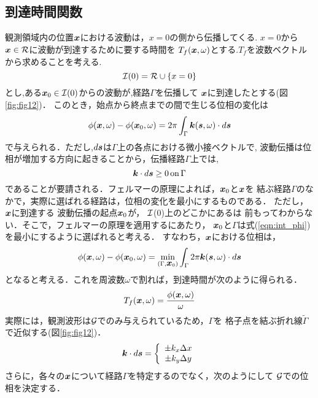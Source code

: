\subsection{到達時間関数}
観測領域内の位置$\mbox{\boldmath{$x$}}$における波動は，$x=0$の側から伝播してくる.
$x=0$から$\fat{x}\in {\cal R}$に波動が到達するために要する時間を
$T_f(\mbox{\boldmath{$x$}},\omega)$とする.$T_f$を波数ベクトルから求めることを考える.
\begin{equation}
	{\cal I}(0)={\cal R} \cup \left\{ x=0\right\}
	\label{eqn:def_I0}
\end{equation}
とし,ある$\fat{x}_0\in {\cal I}(0)$からの波動が,経路$\Gamma$を伝播して
$\mbox{\boldmath{$x$}}$に到達したとする(図\ref{fig:fig12})．
このとき，始点から終点までの間で生じる位相の変化は
\begin{equation}
	\phi(\fat{x},\omega)-\phi(\fat{x}_0,\omega)=
	2\pi \int_{\Gamma} \fat{k}(\fat{s},\omega)\cdot d\fat{s}
	\label{eqn:int_phi}
\end{equation}
で与えられる．ただし,$d\mbox{\boldmath{$s$}}$は$\Gamma$上の各点における微小接ベクトルで, 
波動伝播は位相が増加する方向に起きることから，伝播経路$\Gamma$上では,
\begin{equation}
	\fat{k}\cdot d\fat{s}\geq 0 \, {\rm on} \, \Gamma 
	\label{eqn:}
\end{equation}
であることが要請される．フェルマーの原理によれば，$\mbox{\boldmath{$x$}}_0$と$\mbox{\boldmath{$x$}}$を
結ぶ経路$\Gamma$のなかで，実際に選ばれる経路は，位相の変化を最小にするものである．
ただし，$\mbox{\boldmath{$x$}}$に到達する 波動伝播の起点$\mbox{\boldmath{$x$}}_0$が， $\cal I$(0)上のどこかにあるは
前もってわからない．そこで，フェルマーの原理を適用するにあたり，
$\mbox{\boldmath{$x$}}_0$と$\Gamma$は式(\ref{eqn:int_phi})を最小にするように選ばれると考える．
すなわち，$\mbox{\boldmath{$x$}}$における位相は，
\begin{equation}
	\phi(\fat{x},\omega) - \phi(\fat{x}_0,\omega)
	=
	\min_{\left(\Gamma, \fat{x}_0\right)}
	\int_\Gamma 2\pi \fat{k}(\fat{s},\omega) \cdot d\fat{s}
	\label{eqn:Fermat}
\end{equation}
となると考える．これを周波数$\omega$で割れば，到達時間が次のように得られる．
\begin{equation}
	T_f(\fat{x},\omega) = \frac{\phi(\fat{x},\omega)}{\omega}
	\label{eqn:def_Tf}
\end{equation}
実際には，観測波形は${\cal G}$でのみ与えられているため，$\Gamma$を
格子点を結ぶ折れ線$\tilde \Gamma$で近似する(図\ref{fig:fig12})．
\begin{equation}
	\fat{k}\cdot d\fat{s}
	=
	\left\{
	\begin{array}{c}
		\pm k_x \Delta x \\
		\pm k_y \Delta y
	\end{array}
	\right.
	\label{eqn:}
\end{equation}
さらに，各々の$\mbox{\boldmath{$x$}}$について経路$\Gamma$を特定するのでなく，次のようにして
$\cal G$での位相を決定する．

